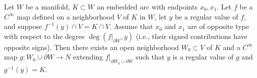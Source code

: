 Let $W$ be a manifold, $K \subset W$ an embedded arc with endpoints $x_0, x_1$. Let $f$ be a $C^{\infty}$ map defined on a neighborhood $V$ of $K$ in $W$, let $y$ be a regular value of $f$, and suppose $f^{-1}(y) \cap V = K \cap V$. Assume that $x_0$ and $x_1$ are of opposite type with respect to the degree $\deg(f|_{\partial W}, y)$ (i.e., their signed contributions have opposite signs). Then there exists an open neighborhood $W_0 \subset V$ of $K$ and a $C^{\infty}$ map $g \colon W_0 \cup \partial W \to N$ extending $f|_{\partial W_0 \cup \partial W}$ such that $y$ is a regular value of $g$ and $g^{-1}(y) = K$.
